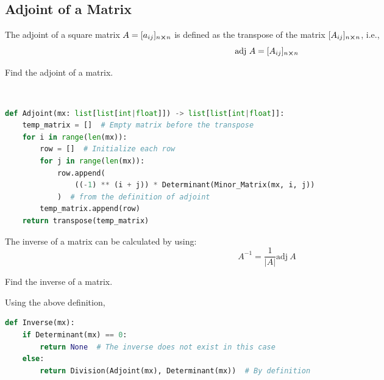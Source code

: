 \subsection{Adjoint of a Matrix}
The adjoint of a square matrix $A=[a_{ij}]_{n\cross n}$ is defined as the transpose of the matrix $[A_{ij}]_{n\cross n}$, i.e.,
\[ \text{adj} \ A=[A_{ij}]_{n\cross n}\]
\begin{eg}
	Find the adjoint of a matrix.
\end{eg}
\begin{explanation} \phantom \\
	\begin{lstlisting}[language=Python, numbers=none]
def Adjoint(mx: list[list[int|float]]) -> list[list[int|float]]:
    temp_matrix = []  # Empty matrix before the transpose
    for i in range(len(mx)):
        row = []  # Initialize each row
        for j in range(len(mx)):
            row.append(
                ((-1) ** (i + j)) * Determinant(Minor_Matrix(mx, i, j))
            )  # from the definition of adjoint
        temp_matrix.append(row)
    return transpose(temp_matrix) \end{lstlisting}
\end{explanation}
The inverse of a matrix can be calculated by using:
\[A^{-1}=\frac{1}{|A|}\text{adj} \ A\]
\begin{eg}
	Find the inverse of a matrix.
\end{eg}
\begin{explanation}
	Using the above definition,
	\begin{lstlisting}[language=Python, numbers=none]
def Inverse(mx):
	if Determinant(mx) == 0:
		return None  # The inverse does not exist in this case
	else:
		return Division(Adjoint(mx), Determinant(mx))  # By definition \end{lstlisting}
\end{explanation}
